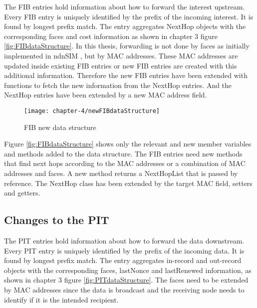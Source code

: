 The FIB entries hold information about how to forward the interest upstream. Every FIB entry is uniquely identified by the prefix of the incoming interest. It is found by longest prefix match. The entry aggregates NextHop objects with the corresponding faces and cost information as shown in chapter 3 figure \ref{fig:FIBdataStructure}.
In this thesis, forwarding is not done by faces as initially implemented in ndnSIM \cite{Afanasyev16}, but by MAC addresses. These MAC addresses are updated inside existing FIB entries or new FIB entries are created with this additional information. Therefore the new FIB entries have been extended with functions to fetch the new information from the NextHop entries. And the NextHop entries have been extended by a new MAC address field.

\vspace{5mm} %

\begin{figure}[H]
  \centering
  \texttt{[image: chapter-4/newFIBdataStructure]}
  \caption{FIB new data structure}
  \label{fig:newFIBdataStructure}
\end{figure}

\vspace{5mm} %

Figure \ref{fig:FIBdataStructure} shows only the relevant and new member variables and methods added to the data structure. The FIB entries need new methods that find next hops according to the MAC addresses or a combination of MAC addresses and faces. A new method returns a NextHopList that is passed by reference. The NextHop class has been extended by the target MAC field, setters and getters.

\newpage

\subsection{Changes to the PIT}

The PIT entries hold information about how to forward the data downstream. Every PIT entry is uniquely identified by the prefix of the incoming data. It is found by longest prefix match. The entry aggregates in-record and out-record objects with the corresponding faces, lastNonce and lastRenewed information, as shown in chapter 3 figure \ref{fig:PITdataStructure}. The faces need to be extended by MAC addresses since the data is broadcast and the receiving node needs to identify if it is the intended recipient.

